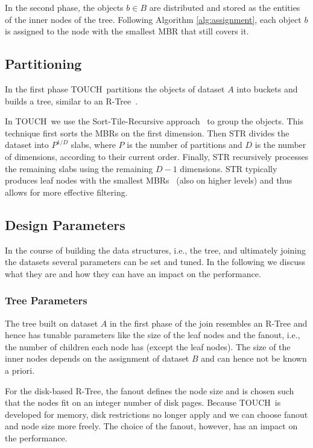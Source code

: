 \documentclass{vldb}
\newcommand{\SJ}{TOUCH}
\begin{document}
In the second phase, the objects $b \in B$ are distributed and stored as the entities of the inner nodes of the tree. Following Algorithm \ref{alg:assignment},
each object $b$ is assigned to the node with the smallest MBR that still covers it.

\subsection{Partitioning}
In the first phase \SJ~partitions the objects of dataset $A$ into buckets and builds a tree, similar to an R-Tree~\cite{rtree}.

In \SJ~we use the Sort-Tile-Recursive approach~\cite{str} to group the objects. This technique first sorts the MBRs on the first dimension. Then STR divides the
dataset into $P^{1/D}$ slabs, where $P$ is the number of partitions and $D$ is the number of dimensions, according to their current order.
Finally, STR recursively processes the remaining slabs using the remaining $D-1$ dimensions. STR typically produces leaf nodes with the smallest
MBRs~\cite{str} (also on higher levels) and thus allows for more effective filtering.

\subsection{Design Parameters}
\label{s_parameters}
In the course of building the data structures, i.e., the tree, and ultimately joining the datasets several parameters can be set and tuned. In the following we
discuss what they are and how they can have an impact on the performance.

\subsubsection{Tree Parameters}
The tree built on dataset $A$ in the first phase of the join resembles an R-Tree and hence has tunable parameters like the size of the leaf nodes and the
fanout, i.e., the number of children each node has (except the leaf nodes). The size of the inner nodes depends on the assignment of dataset $B$ and can hence
not be known a priori.

For the disk-based R-Tree, the fanout defines the node size and is chosen such that the nodes fit on an integer number of disk pages. Because \SJ~is developed
for memory, disk restrictions no longer apply and we can choose fanout and node size more freely. The choice of the fanout, however, has an impact on the
performance.
\end{document}
